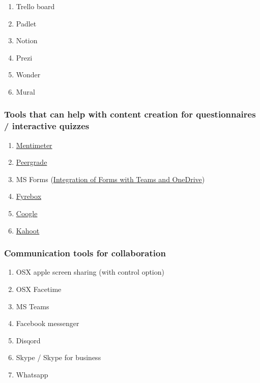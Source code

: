 \documentclass[
]{book}
\providecommand{\tightlist}{%
  \setlength{\itemsep}{0pt}\setlength{\parskip}{0pt}}
\begin{document}
\begin{enumerate}
\def\labelenumi{\arabic{enumi}.}
\tightlist
\item
  Trello board
\item
  Padlet
\item
  Notion
\item
  Prezi
\item
  Wonder
\item
  Mural
\end{enumerate}

\hypertarget{tools-that-can-help-with-content-creation-for-questionnaires-interactive-quizzes}{%
\subsubsection{Tools that can help with content creation for questionnaires / interactive quizzes}\label{tools-that-can-help-with-content-creation-for-questionnaires-interactive-quizzes}}

\begin{enumerate}
\def\labelenumi{\arabic{enumi}.}
\tightlist
\item
  \href{https://www.mentimeter.com}{Mentimeter}
\item
  \url{Peergrade}
\item
  MS Forms (\href{https://www.loom.com/share/ed2fd65abfd64189b2c81f8daff7ec79}{Integration of Forms with Teams and OneDrive})
\item
  \href{https://www.fyrebox.com}{Fyrebox}
\item
  \href{https://coggle.it}{Coogle}
\item
  \url{Kahoot}
\end{enumerate}

\hypertarget{communication-tools-for-collaboration}{%
\subsubsection{Communication tools for collaboration}\label{communication-tools-for-collaboration}}

\begin{enumerate}
\def\labelenumi{\arabic{enumi}.}
\tightlist
\item
  OSX apple screen sharing (with control option)
\item
  OSX Facetime
\item
  MS Teams
\item
  Facebook messenger
\item
  Disqord
\item
  Skype / Skype for business
\item
  Whatsapp
\end{enumerate}
\end{document}
